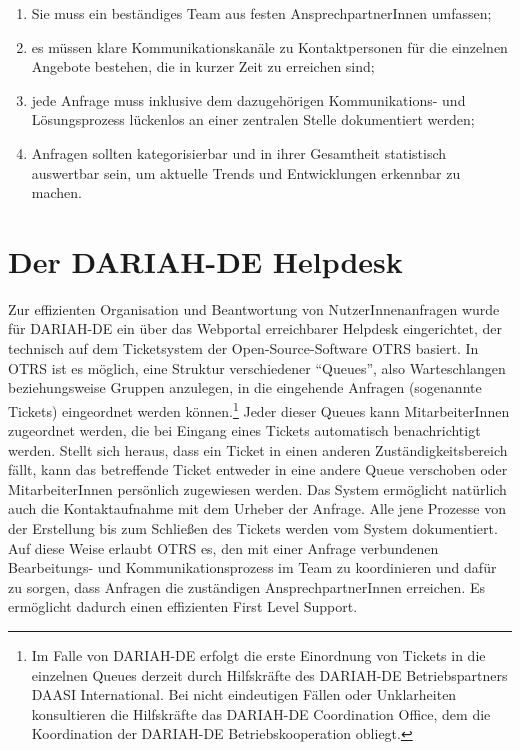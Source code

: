 \documentclass[a4paper,
fontsize=11pt,
oneside,
numbers=noperiodatend,
parskip=half-,
bibliography=totoc,
final
]{scrartcl}
\begin{document}
\begin{enumerate}
\def\labelenumi{\arabic{enumi}.}
\item
  Sie muss ein beständiges Team aus festen AnsprechpartnerInnen
  umfassen;
\item
  es müssen klare Kommunikationskanäle zu Kontaktpersonen für die
  einzelnen Angebote bestehen, die in kurzer Zeit zu erreichen sind;
\item
  jede Anfrage muss inklusive dem dazugehörigen Kommunikations- und
  Lösungsprozess lückenlos an einer zentralen Stelle dokumentiert
  werden;
\item
  Anfragen sollten kategorisierbar und in ihrer Gesamtheit statistisch
  auswertbar sein, um aktuelle Trends und Entwicklungen erkennbar zu
  machen.
\end{enumerate}

\hypertarget{der-dariah-de-helpdesk}{%
\section{Der DARIAH-DE Helpdesk}\label{der-dariah-de-helpdesk}}

Zur effizienten Organisation und Beantwortung von NutzerInnenanfragen
wurde für DARIAH-DE ein über das Webportal erreichbarer Helpdesk
eingerichtet, der technisch auf dem Ticketsystem der
Open-Source-Software OTRS basiert. In OTRS ist es möglich, eine Struktur
verschiedener \enquote{Queues}, also Warteschlangen beziehungsweise
Gruppen anzulegen, in die eingehende Anfragen (sogenannte Tickets)
eingeordnet werden können.\footnote{Im Falle von DARIAH-DE erfolgt die
  erste Einordnung von Tickets in die einzelnen Queues derzeit durch
  Hilfskräfte des DARIAH-DE Betriebspartners DAASI International. Bei
  nicht eindeutigen Fällen oder Unklarheiten konsultieren die
  Hilfskräfte das DARIAH-DE Coordination Office, dem die Koordination
  der DARIAH-DE Betriebskooperation obliegt.} Jeder dieser Queues kann
MitarbeiterInnen zugeordnet werden, die bei Eingang eines Tickets
automatisch benachrichtigt werden. Stellt sich heraus, dass ein Ticket
in einen anderen Zuständigkeitsbereich fällt, kann das betreffende
Ticket entweder in eine andere Queue verschoben oder MitarbeiterInnen
persönlich zugewiesen werden. Das System ermöglicht natürlich auch die
Kontaktaufnahme mit dem Urheber der Anfrage. Alle jene Prozesse von der
Erstellung bis zum Schließen des Tickets werden vom System dokumentiert.
Auf diese Weise erlaubt OTRS es, den mit einer Anfrage verbundenen
Bearbeitungs- und Kommunikationsprozess im Team zu koordinieren und
dafür zu sorgen, dass Anfragen die zuständigen AnsprechpartnerInnen
erreichen. Es ermöglicht dadurch einen effizienten First Level Support.
\end{document}
